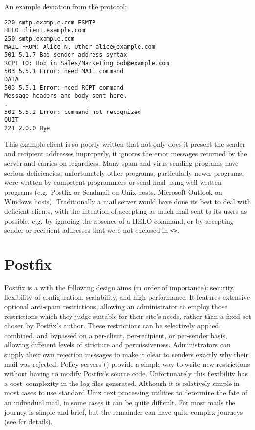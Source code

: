 An example deviation from the protocol:

\begin{verbatim}
220 smtp.example.com ESMTP
HELO client.example.com
250 smtp.example.com
MAIL FROM: Alice N. Other alice@example.com
501 5.1.7 Bad sender address syntax
RCPT TO: Bob in Sales/Marketing bob@example.com
503 5.5.1 Error: need MAIL command
DATA
503 5.5.1 Error: need RCPT command
Message headers and body sent here.
.
502 5.5.2 Error: command not recognized
QUIT
221 2.0.0 Bye
\end{verbatim}

This example client is so poorly written that not only does it present the
sender and recipient addresses improperly, it ignores the error messages
returned by the server and carries on regardless.  Many spam and virus
sending programs have serious deficiencies; unfortunately other programs,
particularly newer programs, were written by competent programmers or send
mail using well written programs (e.g.\ Postfix or Sendmail on Unix hosts,
Microsoft Outlook on Windows hosts).  Traditionally a mail server would
have done its best to deal with deficient clients, with the intention of
accepting as much mail sent to its users as possible, e.g.\ by ignoring the
absence of a HELO command, or by accepting sender or recipient addresses
that were not enclosed in \texttt{<>}.

\section{Postfix}

\label{postfix background}

Postfix is a  with the following design aims (in order of
importance): security, flexibility of configuration, scalability, and high
performance.  It features extensive optional anti-spam restrictions,
allowing an administrator to employ those restrictions which they judge
suitable for their site's needs, rather than a fixed set chosen by
Postfix's author.  These restrictions can be selectively applied, combined,
and bypassed on a per-client, per-recipient, or per-sender basis, allowing
different levels of stricture and permissiveness.  Administrators can
supply their own rejection messages to make it clear to senders exactly why
their mail was rejected.  Policy servers ()
provide a simple way to write new restrictions without having to modify
Postfix's source code.  Unfortunately this flexibility has a cost:
complexity in the log files generated.  Although it is relatively simple in
most cases to use standard Unix text processing utilities to determine the
fate of an individual mail, in some cases it can be quite difficult.  For
most mails the journey is simple and brief, but the remainder can have
quite complex journeys (see  for details).

